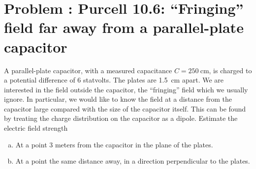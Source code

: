 \documentclass[problems]{esg8022pset}
\begin{document}
\section{Problem \thesection: Purcell 10.6: ``Fringing'' field far away from a parallel-plate capacitor}
  A parallel-plate capacitor, with a measured capacitance $C = \SI{250}{\centi\meter}$,
  is charged to a potential difference of 6 statvolts. The plates
  are \SI{1.5}{\centi\meter} apart. We are interested in the field outside the capacitor,
  the ``fringing'' field which we usually ignore. In particular, we would
  like to know the field at a distance from the capacitor large compared
  with the size of the capacitor itself. This can be found by treating the
  charge distribution on the capacitor as a dipole. Estimate the electric
  field strength
  \begin{enumerate}[(a)]
    \item At a point 3 meters from the capacitor in the plane of the plates.
    \item At a point the same distance away, in a direction perpendicular to the plates.
  \end{enumerate}
\end{document}
